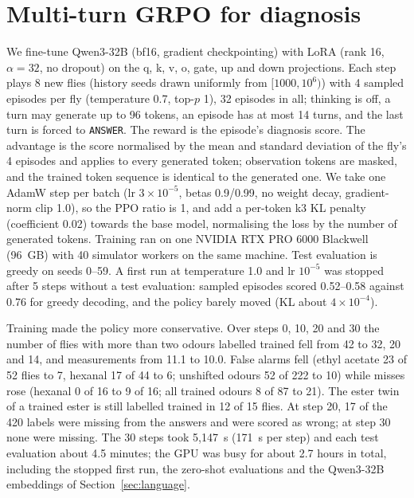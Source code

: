 \section{Multi-turn GRPO for diagnosis}\label{app:grpo}
We fine-tune Qwen3-32B (bf16, gradient checkpointing) with LoRA (rank 16, $\alpha=32$, no dropout) on the q, k, v, o, gate, up and down projections. Each step plays 8 new flies (history seeds drawn uniformly from $[1000, 10^6)$) with 4 sampled episodes per fly (temperature 0.7, top-$p$ 1), 32 episodes in all; thinking is off, a turn may generate up to 96 tokens, an episode has at most 14 turns, and the last turn is forced to \texttt{ANSWER}. The reward is the episode's diagnosis score. The advantage is the score normalised by the mean and standard deviation of the fly's 4 episodes and applies to every generated token; observation tokens are masked, and the trained token sequence is identical to the generated one. We take one AdamW step per batch (lr $3\times10^{-5}$, betas 0.9/0.99, no weight decay, gradient-norm clip 1.0), so the PPO ratio is 1, and add a per-token k3 KL penalty (coefficient 0.02) towards the base model, normalising the loss by the number of generated tokens. Training ran on one NVIDIA RTX PRO 6000 Blackwell (96~GB) with 40 simulator workers on the same machine. Test evaluation is greedy on seeds 0--59. A first run at temperature 1.0 and lr $10^{-5}$ was stopped after 5 steps without a test evaluation: sampled episodes scored 0.52--0.58 against 0.76 for greedy decoding, and the policy barely moved (KL about $4\times10^{-4}$).

Training made the policy more conservative. Over steps 0, 10, 20 and 30 the number of flies with more than two odours labelled trained fell from 42 to 32, 20 and 14, and measurements from 11.1 to 10.0. False alarms fell (ethyl acetate 23 of 52 flies to 7, hexanal 17 of 44 to 6; unshifted odours 52 of 222 to 10) while misses rose (hexanal 0 of 16 to 9 of 16; all trained odours 8 of 87 to 21). The ester twin of a trained ester is still labelled trained in 12 of 15 flies. At step 20, 17 of the 420 labels were missing from the answers and were scored as wrong; at step 30 none were missing. The 30 steps took 5{,}147~s (171~s per step) and each test evaluation about 4.5 minutes; the GPU was busy for about 2.7 hours in total, including the stopped first run, the zero-shot evaluations and the Qwen3-32B embeddings of Section~\ref{sec:language}.


